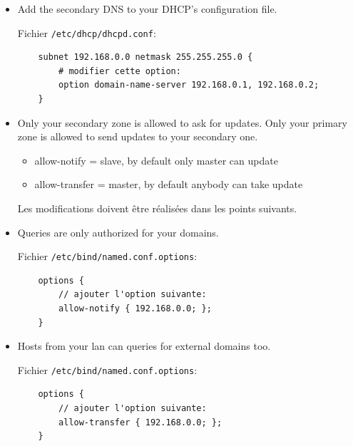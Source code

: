 \documentclass[a4paper]{article}
\begin{document}
\begin{itemize}
\item Add the secondary DNS to your DHCP’s configuration file.
\begin{example}
    Fichier \texttt{/etc/dhcp/dhcpd.conf}:
    \begin{verbatim}
    subnet 192.168.0.0 netmask 255.255.255.0 {
        # modifier cette option:
        option domain-name-server 192.168.0.1, 192.168.0.2;
    }
    \end{verbatim}
\end{example}

\item Only your secondary zone is allowed to ask for updates. Only your primary zone is allowed to send updates to your secondary one.
\begin{itemize}
    \item allow-notify = slave, by default only master can update
    \item allow-transfer = master, by default anybody can take update
\end{itemize}
\begin{example}
    Les modifications doivent être réalisées dans les points suivants.
\end{example}

\item Queries are only authorized for your domains.
\begin{example}
    Fichier \texttt{/etc/bind/named.conf.options}:
    \begin{verbatim}
    options {
        // ajouter l'option suivante:
        allow-notify { 192.168.0.0; };
    }
    \end{verbatim}
\end{example}

\item Hosts from your lan can queries for external domains too.
\begin{example}
    Fichier \texttt{/etc/bind/named.conf.options}:
    \begin{verbatim}
    options {
        // ajouter l'option suivante:
        allow-transfer { 192.168.0.0; };
    }
    \end{verbatim}
\end{example}


\end{itemize}
\end{document}
